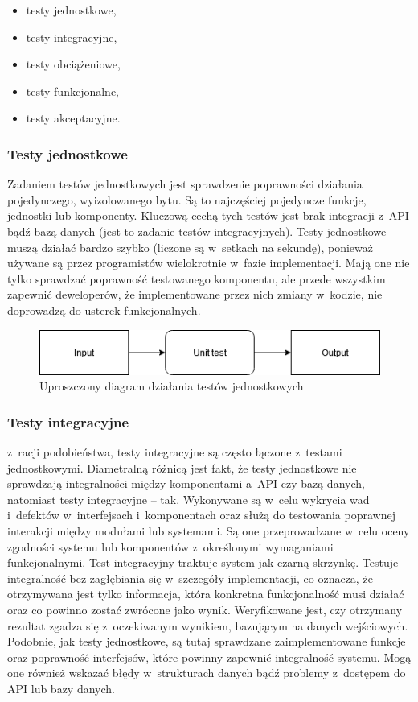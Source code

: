 \documentclass[oneside,polski,logo]{amuthesis}
\begin{document}
\begin{itemize}
	\item testy jednostkowe,
	\item testy integracyjne,
	\item testy obciążeniowe,
	\item testy funkcjonalne,
	\item testy akceptacyjne.
\end{itemize}

\subsubsection {Testy jednostkowe}
Zadaniem testów jednostkowych jest sprawdzenie poprawności działania pojedynczego, wyizolowanego bytu. Są to najczęściej pojedyncze funkcje, jednostki lub komponenty. Kluczową cechą tych testów jest brak integracji z~API bądź bazą danych (jest to zadanie testów integracyjnych). Testy jednostkowe muszą działać bardzo szybko (liczone są w~setkach na sekundę), ponieważ używane są przez programistów wielokrotnie w~fazie implementacji. Mają one nie tylko sprawdzać poprawność testowanego komponentu, ale przede wszystkim zapewnić deweloperów, że implementowane przez nich zmiany w~kodzie, nie doprowadzą do usterek funkcjonalnych. \cite{testJ}
\newpage

\begin{figure}[h]
	\centering
	\includegraphics[width=12cm]{images/hyps/unit-test-flow.png}
	\caption{Uproszczony diagram działania testów jednostkowych}
\end{figure}

\subsubsection {Testy integracyjne}
z~racji podobieństwa, testy integracyjne są często łączone z~testami jednostkowymi. Diametralną różnicą jest fakt, że testy jednostkowe nie sprawdzają integralności między komponentami a~API czy bazą danych, natomiast testy integracyjne – tak. Wykonywane są w~celu wykrycia wad i~defektów w~interfejsach i~komponentach oraz służą do testowania poprawnej interakcji między modułami lub systemami. Są one przeprowadzane w~celu oceny zgodności systemu lub komponentów z~określonymi wymaganiami funkcjonalnymi. Test integracyjny traktuje system jak czarną skrzynkę. Testuje integralność bez zagłębiania się w~szczegóły implementacji, co oznacza, że otrzymywana jest tylko informacja, która konkretna funkcjonalność musi działać oraz co powinno zostać zwrócone jako wynik. Weryfikowane jest, czy otrzymany rezultat zgadza się z~oczekiwanym wynikiem, bazującym na danych wejściowych. Podobnie, jak testy jednostkowe, są tutaj sprawdzane zaimplementowane funkcje oraz poprawność interfejsów, które powinny zapewnić integralność systemu. Mogą one również wskazać błędy w~strukturach danych bądź problemy z~dostępem do API lub bazy danych. \cite{testI}
\end{document}
